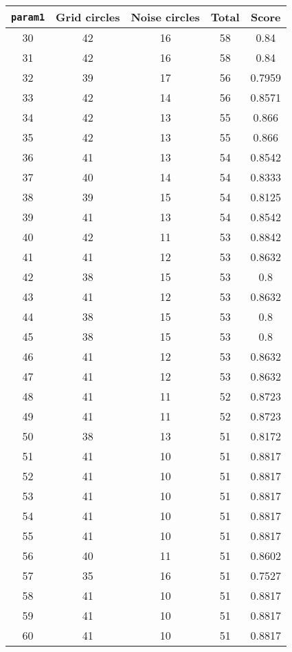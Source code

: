 \documentclass[letterpaper, 12pt]{article}
\begin{document}
\begin{longtable}{|c|c|c|c|c|}
\hline
\textbf{\texttt{param1}} & \textbf{Grid circles} & \textbf{Noise circles} & \textbf{Total} & \textbf{Score} \\
\hline
30 & 42 & 16 & 58 & 0.84 \\
\hline
31 & 42 & 16 & 58 & 0.84 \\
\hline
32 & 39 & 17 & 56 & 0.7959 \\
\hline
33 & 42 & 14 & 56 & 0.8571 \\
\hline
34 & 42 & 13 & 55 & 0.866 \\
\hline
35 & 42 & 13 & 55 & 0.866 \\
\hline
36 & 41 & 13 & 54 & 0.8542 \\
\hline
37 & 40 & 14 & 54 & 0.8333 \\
\hline
38 & 39 & 15 & 54 & 0.8125 \\
\hline
39 & 41 & 13 & 54 & 0.8542 \\
\hline
40 & 42 & 11 & 53 & 0.8842 \\
\hline
41 & 41 & 12 & 53 & 0.8632 \\
\hline
42 & 38 & 15 & 53 & 0.8 \\
\hline
43 & 41 & 12 & 53 & 0.8632 \\
\hline
44 & 38 & 15 & 53 & 0.8 \\
\hline
45 & 38 & 15 & 53 & 0.8 \\
\hline
46 & 41 & 12 & 53 & 0.8632 \\
\hline
47 & 41 & 12 & 53 & 0.8632 \\
\hline
48 & 41 & 11 & 52 & 0.8723 \\
\hline
49 & 41 & 11 & 52 & 0.8723 \\
\hline
50 & 38 & 13 & 51 & 0.8172 \\
\hline
51 & 41 & 10 & 51 & 0.8817 \\
\hline
52 & 41 & 10 & 51 & 0.8817 \\
\hline
53 & 41 & 10 & 51 & 0.8817 \\
\hline
54 & 41 & 10 & 51 & 0.8817 \\
\hline
55 & 41 & 10 & 51 & 0.8817 \\
\hline
56 & 40 & 11 & 51 & 0.8602 \\
\hline
57 & 35 & 16 & 51 & 0.7527 \\
\hline
58 & 41 & 10 & 51 & 0.8817 \\
\hline
59 & 41 & 10 & 51 & 0.8817 \\
\hline
60 & 41 & 10 & 51 & 0.8817 \\

\end{longtable}
\end{document}
